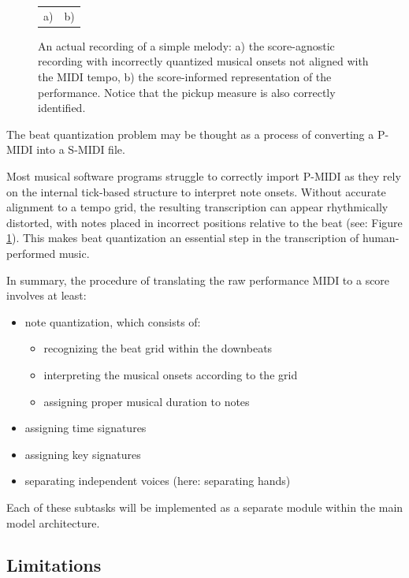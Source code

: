 \begin{figure}[ht!]
\centering
\begin{tabular}{cc}a)

 & b)
\end{tabular}
\caption{An actual recording of a simple melody: a) the score-agnostic recording with incorrectly quantized musical onsets not aligned with the MIDI tempo, b) the score-informed representation of the performance. Notice that the pickup measure is also correctly identified.}
\label{score_informed}
\end{figure}

The beat quantization problem may be thought as a process of converting a P-MIDI into a S-MIDI file.

Most musical software programs struggle to correctly import P-MIDI as they rely on the internal tick-based structure to interpret note onsets. Without accurate alignment to a tempo grid, the resulting transcription can appear rhythmically distorted, with notes placed in incorrect positions relative to the beat (see: Figure \ref{score_informed}). This makes beat quantization an essential step in the transcription of human-performed music.

In summary, the procedure of translating the raw performance MIDI to a score involves at least: \begin{itemize}
	\item note quantization, which consists of:
	\begin{itemize}
		\item recognizing the beat grid within the downbeats
		\item interpreting the musical onsets according to the grid
		\item assigning proper musical duration to notes	
	\end{itemize}
	\item assigning time signatures
	\item assigning key signatures
	\item separating independent voices (here: separating hands)
\end{itemize}

Each of these subtasks will be implemented as a separate module within the main model architecture.

\subsection{Limitations}

